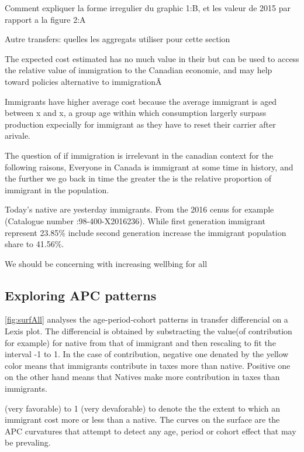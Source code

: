 Comment expliquer la forme irregulier du graphic 1:B, et les valeur de 2015 par rapport a la figure 2:A

Autre transfers: quelles les aggregats utiliser pour cette section


The expected cost estimated has no much value in their but can be used to access the relative value of immigration to the Canadian economie, and may help toward policies alternative to immigrationÃ 


Immigrants have higher average cost because the average immigrant is aged between x and x, a group age within which consumption largerly surpass production expecially for immigrant as they have to reset their carrier after arivale.





The question of if immigration is irrelevant in the canadian context for the following raisons,
Everyone in Canada is immigrant at some time in history, and the further we go back in time the greater the is the relative proportion of immigrant in the population.



Today's native are yesterday immigrants. From the 2016 cenus for example (Catalogue number :98-400-X2016236). While first generation immigrant represent 23.85\% include second generation increase the immigrant population share to 41.56\%.

We should be concerning with increasing wellbing for all



\subsection{Exploring APC patterns}\label{sec:apc}
  \autoref{fig:surfAll} analyses the age-period-cohort patterns  in transfer differencial on a Lexis plot. The differencial is obtained by substracting the value(of contribution for example) for native from that of immigrant and then rescaling to fit the interval -1 to 1. In the case of contribution, negative one denated by the yellow color means that immigrants contribute in taxes more than native. Positive one on the other hand means that Natives make more contribution in taxes than immigrants.

  (very favorable) to 1 (very devaforable) to denote the the extent to which an immigrant cost more or less than a native. The curves on the surface are the APC curvatures that attempt to detect any age, period or cohort effect that may be prevaling.


